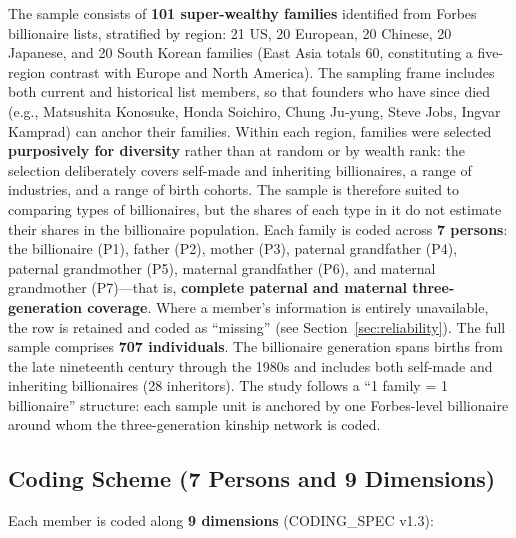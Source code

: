 \documentclass[11pt,a4paper]{article}
\begin{document}
The sample consists of \textbf{101 super-wealthy families} identified from Forbes billionaire lists, stratified by region: 21 US, 20 European, 20 Chinese, 20 Japanese, and 20 South Korean families (East Asia totals 60, constituting a five-region contrast with Europe and North America). The sampling frame includes both current and historical list members, so that founders who have since died (e.g., Matsushita Konosuke, Honda Soichiro, Chung Ju-yung, Steve Jobs, Ingvar Kamprad) can anchor their families. Within each region, families were selected \textbf{purposively for diversity} rather than at random or by wealth rank: the selection deliberately covers self-made and inheriting billionaires, a range of industries, and a range of birth cohorts. The sample is therefore suited to comparing types of billionaires, but the shares of each type in it do not estimate their shares in the billionaire population. Each family is coded across \textbf{7 persons}: the billionaire (P1), father (P2), mother (P3), paternal grandfather (P4), paternal grandmother (P5), maternal grandfather (P6), and maternal grandmother (P7)---that is, \textbf{complete paternal and maternal three-generation coverage}. Where a member's information is entirely unavailable, the row is retained and coded as ``missing'' (see Section~\ref{sec:reliability}). The full sample comprises \textbf{707 individuals}. The billionaire generation spans births from the late nineteenth century through the 1980s and includes both self-made and inheriting billionaires (28 inheritors). The study follows a ``1 family = 1 billionaire'' structure: each sample unit is anchored by one Forbes-level billionaire around whom the three-generation kinship network is coded.

\subsection{Coding Scheme (7 Persons and 9 Dimensions)}

Each member is coded along \textbf{9 dimensions} (CODING\_SPEC v1.3):
\end{document}

